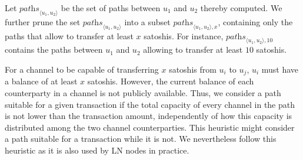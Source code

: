 


Let $\textit{paths}_{\langle u_1, u_2 \rangle}$ be the set of paths between $u_1$ and $u_2$ thereby computed. 
We further prune the set $\textit{paths}_{\langle u_1, u_2 \rangle}$ into a subset 
$\textit{paths}_{\langle u_1, u_2 \rangle, x}$, containing  only the paths that 
allow to transfer at least $x$ satoshis. 
For instance, $\textit{paths}_{\langle u_1, u_2 \rangle, 10}$ 
contains the paths between $u_1$ and $u_2$ allowing to transfer at least $10$ satoshis. 


For a channel to be capable of transferring $x$ satoshis from $u_i$ to $u_j$, $u_i$ must have a balance of 
at least $x$ satoshis. However, the current balance of each counterparty in a channel is not publicly available. 
Thus, we consider a path suitable for a given transaction if the total capacity of every channel 
in the path is not lower than the transaction amount, independently of how this capacity 
is distributed among the two channel counterparties. 
This heuristic might consider a path suitable for a transaction while it is not.
We nevertheless follow this heuristic as it is also used by LN nodes in practice. 

